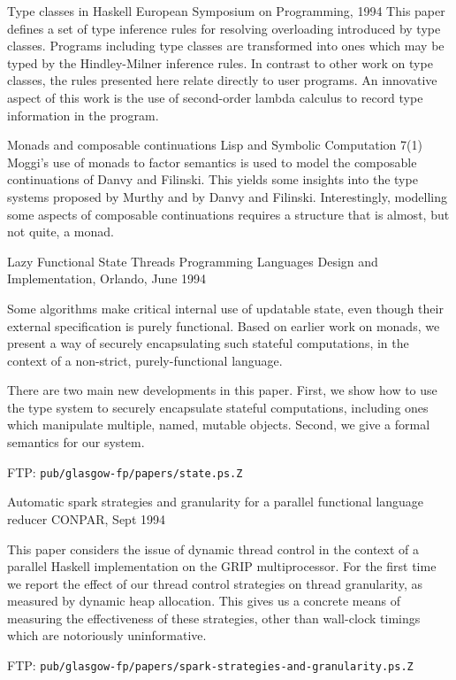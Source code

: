 {Type classes in Haskell}
{European Symposium on Programming, 1994}
{
This paper defines a set of type inference rules for resolving
overloading introduced by type classes.  Programs including type
classes are transformed into ones which may be typed by the
Hindley-Milner inference rules.  In contrast to other work on type
classes, the rules presented here relate directly to user programs.
An innovative aspect of this work is the use of second-order lambda
calculus to record type information in the program.
}

{Monads and composable continuations}
{Lisp and Symbolic Computation 7(1)}
{Moggi's use of monads to factor semantics is used to model the
composable continuations of Danvy and Filinski.  This yields some
insights into the type systems proposed by Murthy and by Danvy and
Filinski.  Interestingly, modelling some aspects of composable
continuations requires a structure that is almost, but not quite, a
monad.
}

{Lazy Functional State Threads}
{Programming Languages Design and Implementation, Orlando, June 1994}
{
Some algorithms make critical internal use of updatable state, even
though their external specification is purely functional.  Based on
earlier work on monads, we present a way of securely encapsulating
such stateful computations, in the context of a non-strict,
purely-functional language.  

There are two main new developments in this paper.  First, we show how
to use the type system to securely encapsulate stateful computations,
including ones which manipulate multiple, named, mutable objects.
Second, we give a formal semantics for our system.

FTP: {\tt pub/glasgow-fp/papers/state.ps.Z}
}

{Automatic spark strategies and granularity for a parallel functional language reducer}
{CONPAR, Sept 1994}
{
This paper considers the issue of dynamic thread control in the context
of a parallel Haskell implementation on the GRIP multiprocessor.
For the first time we report the effect of our thread control strategies 
on thread granularity, as measured by dynamic heap allocation.  This
gives us a concrete means of measuring the effectiveness of these strategies,
other than wall-clock timings which are notoriously uninformative.

FTP: {\tt pub/glasgow-fp/papers/spark-strategies-and-granularity.ps.Z}
}

